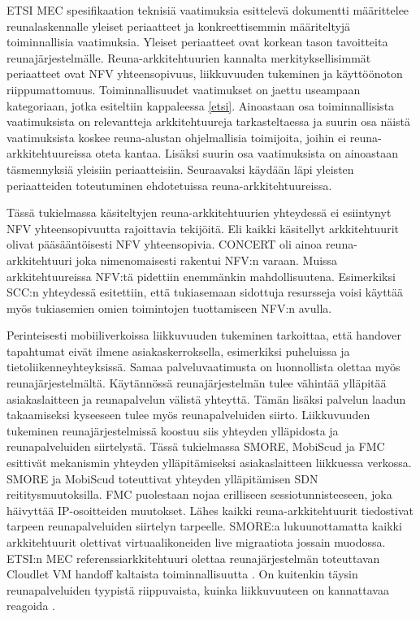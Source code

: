 ETSI MEC spesifikaation teknisiä vaatimuksia esittelevä dokumentti \cite{etsitechreq} määrittelee reunalaskennalle yleiset periaatteet ja konkreettisemmin määriteltyjä toiminnallisia vaatimuksia. 
Yleiset periaatteet ovat korkean tason tavoitteita reunajärjestelmälle.
Reuna-arkkitehtuurien kannalta merkityksellisimmät periaatteet ovat NFV yhteensopivuus, liikkuvuuden tukeminen ja käyttöönoton riippumattomuus.
Toiminnallisuudet vaatimukset on jaettu useampaan kategoriaan, jotka esiteltiin kappaleessa \ref{etsi}.
Ainoastaan osa toiminnallisista vaatimuksista on relevantteja arkkitehtuureja tarkasteltaessa ja suurin osa näistä vaatimuksista koskee reuna-alustan ohjelmallisia toimijoita, joihin ei reuna-arkkitehtuureissa oteta kantaa.
Lisäksi suurin osa vaatimuksista on ainoastaan täsmennyksiä yleisiin periaatteisiin.
Seuraavaksi käydään läpi yleisten periaatteiden toteutuminen ehdotetuissa reuna-arkkitehtuureissa.

Tässä tukielmassa käsiteltyjen reuna-arkkitehtuurien yhteydessä ei esiintynyt NFV yhteensopivuutta rajoittavia tekijöitä. Eli kaikki käsitellyt arkkitehtuurit olivat pääsääntöisesti NFV yhteensopivia.
CONCERT oli ainoa reuna-arkkitehtuuri joka nimenomaisesti rakentui NFV:n varaan. Muissa arkkitehtuureissa NFV:tä pidettiin enemmänkin mahdollisuutena.
Esimerkiksi SCC:n yhteydessä esitettiin, että tukiasemaan sidottuja resursseja voisi käyttää myös tukiasemien omien toimintojen tuottamiseen NFV:n avulla. 


Perinteisesti mobiiliverkoissa liikkuvuuden tukeminen tarkoittaa, että handover tapahtumat eivät ilmene asiakaskerroksella, esimerkiksi puheluissa ja tietoliikenneyhteyksissä.
Samaa palveluvaatimusta on luonnollista olettaa myös reunajärjestelmältä. 
Käytännössä reunajärjestelmän tulee vähintää ylläpitää asiakaslaitteen ja reunapalvelun välistä yhteyttä.
Tämän lisäksi palvelun laadun takaamiseksi kyseeseen tulee myös reunapalveluiden siirto.
Liikkuvuuden tukeminen reunajärjestelmissä koostuu siis yhteyden ylläpidosta ja reunapalveluiden siirtelystä.
Tässä tukielmassa SMORE, MobiScud ja FMC esittivät mekanismin yhteyden ylläpitämiseksi asiakaslaitteen liikkuessa verkossa.
SMORE ja MobiScud toteuttivat yhteyden ylläpitämisen SDN reititysmuutoksilla.
FMC puolestaan nojaa erilliseen sessiotunnisteeseen, joka häivyttää IP-osoitteiden muutokset.
Lähes kaikki reuna-arkkitehtuurit tiedostivat tarpeen reunapalveluiden siirtelyn tarpeelle.
SMORE:a lukuunottamatta kaikki arkkitehtuurit olettivat virtuaalikoneiden live migraatiota jossain muodossa.  
ETSI:n MEC referenssiarkkitehtuuri olettaa reunajärjestelmän toteuttavan Cloudlet VM handoff kaltaista toiminnallisuutta \cite{etsirefarch}.
On kuitenkin täysin reunapalveluiden tyypistä riippuvaista, kuinka liikkuvuuteen on kannattavaa reagoida \cite{etsitechreq}. 


